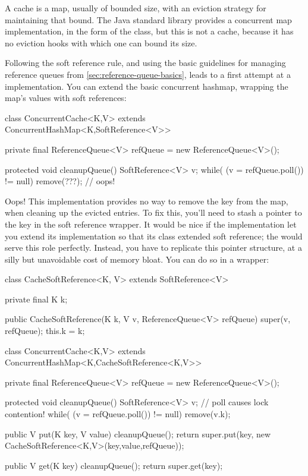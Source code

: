 A cache is a map, usually of bounded size, with an eviction strategy for
maintaining that bound. The Java standard library provides a
concurrent map implementation, in the form of the 
class, but this is not a cache, because it has no eviction hooks with which one
can bound its size.

Following the soft reference rule, and using the basic guidelines for managing
reference queues from \autoref{sec:reference-queue-basics}, leads to a first
attempt at a  implementation. You can extend the basic
concurrent hashmap, wrapping the map's values with soft references:
\begin{shortlisting}
class ConcurrentCache<K,V> extends ConcurrentHashMap<K,SoftReference<V>> {
   private final ReferenceQueue<V> refQueue = new ReferenceQueue<V>();
   
   protected void cleanupQueue() {
      SoftReference<V> v;
      while( (v = refQueue.poll()) != null) {
         remove(???); // oops!
      }
   }
}
\end{shortlisting}
Oops! This implementation provides no way to remove the key from the map, when
cleaning up the evicted entries. To fix this, you'll need to stash a pointer to
the key in the soft reference wrapper. It would be nice if the
 implementation let you extend
its implementation so that its  class extended soft reference;
the  would serve this role perfectly. Instead, you have to
replicate this pointer structure, at a silly but unavoidable cost of memory
bloat. You can do so in a  wrapper:
\begin{shortlisting}
class CacheSoftReference<K, V> extends SoftReference<V> {
   private final K k;
   
   public CacheSoftReference(K k, V v, ReferenceQueue<V> refQueue) {
      super(v, refQueue);
      this.k = k;
   }
}

class ConcurrentCache<K,V> extends ConcurrentHashMap<K,CacheSoftReference<K,V>> {
   private final ReferenceQueue<V> refQueue = new ReferenceQueue<V>();
   
   protected void cleanupQueue() {
      SoftReference<V> v;
      // poll causes lock contention!
      while( (v = refQueue.poll()) != null) {
         remove(v.k);
      }
   }
   
   public V put(K key, V value) {
      cleanupQueue();
      return super.put(key, new CacheSoftReference<K,V>(key,value,refQueue));
   }
   
   public V get(K key) {
      cleanupQueue();
      return super.get(key);
   }
}
\end{shortlisting}
